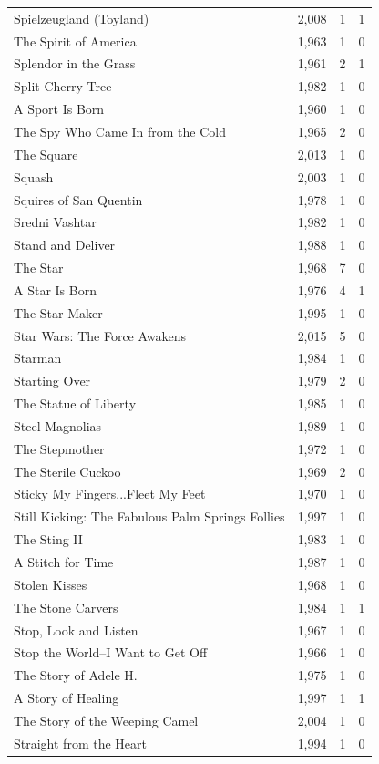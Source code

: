 \begin{tabular}{lrrr}
Spielzeugland (Toyland) & 2,008 & 1 & 1 \\
The Spirit of America & 1,963 & 1 & 0 \\
Splendor in the Grass & 1,961 & 2 & 1 \\
Split Cherry Tree & 1,982 & 1 & 0 \\
A Sport Is Born & 1,960 & 1 & 0 \\
The Spy Who Came In from the Cold & 1,965 & 2 & 0 \\
The Square & 2,013 & 1 & 0 \\
Squash & 2,003 & 1 & 0 \\
Squires of San Quentin & 1,978 & 1 & 0 \\
Sredni Vashtar & 1,982 & 1 & 0 \\
Stand and Deliver & 1,988 & 1 & 0 \\
The Star & 1,968 & 7 & 0 \\
A Star Is Born & 1,976 & 4 & 1 \\
The Star Maker & 1,995 & 1 & 0 \\
Star Wars: The Force Awakens & 2,015 & 5 & 0 \\
Starman & 1,984 & 1 & 0 \\
Starting Over & 1,979 & 2 & 0 \\
The Statue of Liberty & 1,985 & 1 & 0 \\
Steel Magnolias & 1,989 & 1 & 0 \\
The Stepmother & 1,972 & 1 & 0 \\
The Sterile Cuckoo & 1,969 & 2 & 0 \\
Sticky My Fingers...Fleet My Feet & 1,970 & 1 & 0 \\
Still Kicking: The Fabulous Palm Springs Follies & 1,997 & 1 & 0 \\
The Sting II & 1,983 & 1 & 0 \\
A Stitch for Time & 1,987 & 1 & 0 \\
Stolen Kisses & 1,968 & 1 & 0 \\
The Stone Carvers & 1,984 & 1 & 1 \\
Stop, Look and Listen & 1,967 & 1 & 0 \\
Stop the World--I Want to Get Off & 1,966 & 1 & 0 \\
The Story of Adele H. & 1,975 & 1 & 0 \\
A Story of Healing & 1,997 & 1 & 1 \\
The Story of the Weeping Camel & 2,004 & 1 & 0 \\
Straight from the Heart & 1,994 & 1 & 0 \\

\end{tabular}
